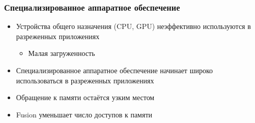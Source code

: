\documentclass[xcolor=table,aspectratio=169]{beamer}
\begin{document}
  
\begin{frame}[fragile] \frametitle{Специализированное аппаратное обеспечение}
    \begin{itemize}
        \item Устройства общего назначения (CPU, GPU) неэффективно используются в разреженных приложениях
        \vfill
        \begin{itemize}
            \item Малая загруженность
            \vfill
        \end{itemize}
        \item Специализированное аппаратное обеспечение начинает широко использоваться в разреженных приложениях
        \vfill
        \item Обращение к памяти остаётся узким местом
        \vfill
        \item \textcolor{codepurple}{Fusion уменьшает число доступов к памяти}
    \end{itemize}
  \end{frame}  

\end{document}
